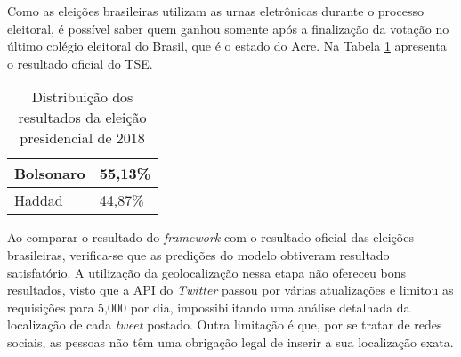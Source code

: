  
 Como as eleições brasileiras utilizam as urnas eletrônicas durante o processo eleitoral, é possível saber 
 quem ganhou somente após a finalização da votação no último colégio eleitoral do Brasil, que é o estado do Acre. Na Tabela
 \ref{tb:tse2018} apresenta o resultado oficial do \acrshort{TSE}.
 
 
 \begin{table}[tbp]
     \centering
     \caption{Distribuição dos resultados da eleição presidencial de 2018}
     \label{tb:tse2018}
     \begin{tabular}{ll}
     \hline
     Bolsonaro & 55,13\% \\ \hline
     Haddad & 44,87\% \\ \hline
     \end{tabular}
 \end{table}
 
 
 Ao comparar o resultado do \textit{framework} com o resultado oficial das eleições brasileiras, verifica-se que as predições do modelo obtiveram resultado satisfatório. A utilização da geolocalização nessa etapa não ofereceu bons resultados, visto que
 a \acrshort{API} do \textit{Twitter} passou por várias atualizações e limitou as requisições para 5,000 por dia, impossibilitando 
 uma análise detalhada da localização de cada \textit{tweet} postado. Outra limitação é que, por se tratar de redes sociais, as pessoas
 não têm uma obrigação legal de inserir a sua localização exata.